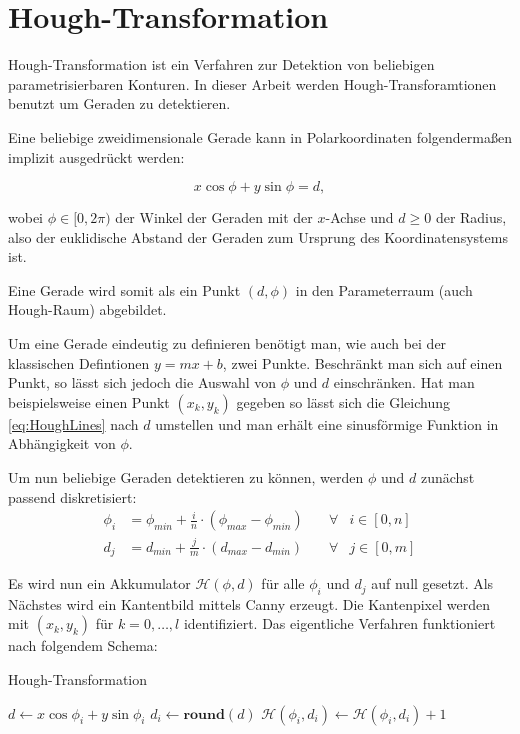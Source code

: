 \section{Hough-Transformation}
\label{s:hough}
Hough-Transformation ist ein Verfahren zur Detektion von beliebigen parametrisierbaren Konturen. In dieser Arbeit werden Hough-Transforamtionen benutzt um Geraden zu detektieren.

Eine beliebige zweidimensionale Gerade kann in Polarkoordinaten folgendermaßen implizit ausgedrückt werden:

\begin{equation}\label{eq:HoughLines}
x\cos\phi + y\sin\phi = d,
\end{equation}

wobei $\phi \in [0,2\pi)$ der Winkel der Geraden mit der $x$-Achse und $d \geq 0$ der Radius, also der euklidische Abstand der Geraden zum Ursprung des Koordinatensystems ist.

Eine Gerade wird somit als ein Punkt $(d,\phi)$ in den Parameterraum (auch Hough-Raum) abgebildet.

Um eine Gerade eindeutig zu definieren benötigt man, wie auch bei der klassischen Defintionen $y = mx + b$, zwei Punkte. Beschränkt man sich auf einen Punkt, so lässt sich jedoch die Auswahl von $\phi$ und $d$ einschränken. Hat man beispielsweise einen Punkt $(x_k,y_k)$ gegeben so lässt sich die Gleichung \ref{eq:HoughLines} nach $d$ umstellen und man erhält eine sinusförmige Funktion in Abhängigkeit von $\phi$.

Um nun beliebige Geraden detektieren zu können, werden $\phi$ und $d$ zunächst passend diskretisiert:
\[
	\begin{aligned}
		\phi_i &= \phi_{min} + \frac{i}{n} \cdot (\phi_{max} - \phi_{min}) \quad&\forall &i\in [0,n]\\
		d_j &= d_{min} + \frac{j}{m} \cdot  (d_{max} - d_{min}) &\forall &j\in [0,m]
	\end{aligned}
\]



Es wird nun ein Akkumulator $\mathcal{H}(\phi, d)$ für alle $\phi_i$ und $d_j$ auf null gesetzt.
Als Nächstes wird ein Kantentbild mittels Canny \cite{Canny1986} erzeugt. Die Kantenpixel werden mit $(x_k,y_k)$ für $k = 0,\dotsc,l$ identifiziert. Das eigentliche Verfahren funktioniert nach folgendem Schema:

\begin{algorithm}
	\caption{Hough-Transformation}\label{euclid}
	\begin{algorithmic}[1]
		 
		 
		\State $d \gets x\cos\phi_i + y\sin\phi_i$
		\State $d_i \gets \textbf{round}(d)$ 
		\State  $\mathcal{H}(\phi_i, d_i) \gets \mathcal{H}(\phi_i, d_i) + 1$
		\EndFor
		\EndFor
	\end{algorithmic}
\end{algorithm}

